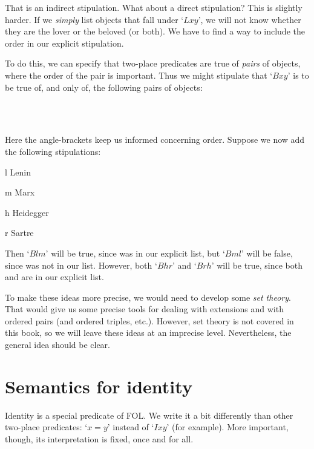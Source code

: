 That is an indirect stipulation. What about a direct stipulation? This is slightly harder. If we \emph{simply} list objects that fall under `$Lxy$', we will not know whether they are the lover or the beloved (or both). We have to find a way to include the order in our explicit stipulation. 

To do this, we can specify that two-place predicates are true of \emph{pairs} of objects, where the order of the pair is important. Thus we might stipulate that `$Bxy$' is to be true of, and only of, the following pairs of objects:
	\begin{center}
		\\
		\\
	\end{center}
Here the angle-brackets keep us informed concerning order. Suppose we now add the following stipulations:
	\begin{ekey}
		\item[l] Lenin
		\item[m] Marx
		\item[h] Heidegger
		\item[r] Sartre
	\end{ekey}
Then `$Blm$' will be true, since  was in our explicit list, but `$Bml$' will be false, since  was not in our list. However, both `$Bhr$' and `$Brh$' will be true, since both  and  are in our explicit list.

To make these ideas more precise, we would need to develop some \emph{set theory}. That would give us some precise tools for dealing with extensions and with ordered pairs (and ordered triples, etc.). However, set theory is not covered in this book, so we will leave these ideas at an imprecise level. Nevertheless, the general idea should be clear.


\section{Semantics for identity}
Identity is a special predicate of FOL. We write it a bit differently than other two-place predicates: `$x=y$' instead of `$Ixy$' (for example). More important, though, its interpretation is fixed, once and for all. 

